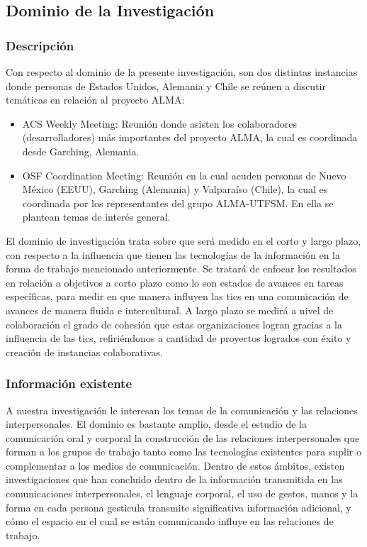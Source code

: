 \subsection{Dominio de la Investigación}

\subsubsection{Descripción}
Con respecto al dominio de la presente investigación, son dos distintas
instancias donde personas de Estados Unidos, Alemania y Chile se reúnen
a discutir temáticas en relación al proyecto ALMA:

\begin{itemize}
	\item ACS Weekly Meeting: Reunión donde asisten los colaboradores
(desarrolladores) más importantes del proyecto ALMA, la cual es coordinada
 desde Garching, Alemania.
	\item OSF Coordination Meeting: Reunión en la cual acuden personas de Nuevo
México (EEUU), Garching (Alemania) y Valparaíso (Chile), la cual es 
coordinada por los representantes del grupo ALMA-UTFSM. En ella se plantean temas
de interés general.
\end{itemize}

El dominio de investigación trata sobre que será medido en el corto y largo plazo, 
con respecto a la influencia que tienen las tecnologías de la información en la forma
de trabajo mencionado anteriormente. Se tratará de enfocar los resultados en relación
a objetivos a corto plazo como lo son estados de avances en tareas específicas, para 
medir en que manera influyen las tics en una comunicación de avances de manera fluida e 
intercultural. A largo plazo se medirá a nivel de colaboración el grado de cohesión que 
estas organizaciones logran gracias a la influencia de las tics, refiriéndonos a cantidad
de proyectos logrados con éxito y creación de instancias colaborativas.

\subsubsection{Información existente}

A nuestra investigación le interesan los temas de la comunicación y las
relaciones interpersonales. El dominio es bastante amplio, desde el estudio de
la comunicación oral y corporal la construcción de las relaciones
interpersonales que forman a los grupos de trabajo tanto como las tecnologías
existentes para suplir o complementar a los medios de comunicación.
Dentro de estos ámbitos, existen investigaciones\cite{obs_collaborative} que
han concluido dentro de la información transmitida en las comunicaciones
interpersonales, el lenguaje corporal, el uso de gestos, manos y la forma en
cada persona gesticula transmite significativa información adicional, y cómo
el espacio en el cual se están comunicando influye en las relaciones de
trabajo.

